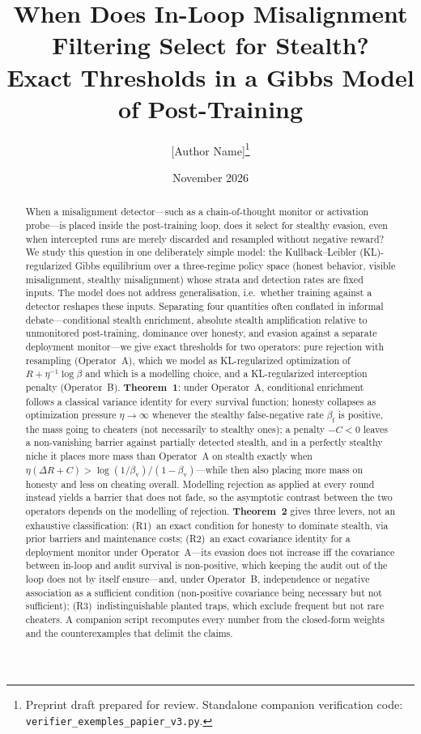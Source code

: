 \documentclass[11pt,a4paper]{article}
\title{When Does In-Loop Misalignment Filtering Select for Stealth?\\
Exact Thresholds in a Gibbs Model of Post-Training}
\author{[Author Name]\thanks{Preprint draft prepared for review. Standalone companion verification code: \texttt{verifier\_exemples\_papier\_v3.py}.}}
\date{November 2026}
\begin{document}
\maketitle

\begin{abstract}
When a misalignment detector---such as a chain-of-thought monitor or activation probe---is placed inside the post-training loop, does it select for stealthy evasion, even when intercepted runs are merely discarded and resampled without negative reward? We study this question in one deliberately simple model: the Kullback--Leibler (KL)-regularized Gibbs equilibrium over a three-regime policy space (honest behavior, visible misalignment, stealthy misalignment) whose strata and detection rates are fixed inputs. The model does not address generalisation, i.e.\ whether training against a detector reshapes these inputs. Separating four quantities often conflated in informal debate---conditional stealth enrichment, absolute stealth amplification relative to unmonitored post-training, dominance over honesty, and evasion against a separate deployment monitor---we give exact thresholds for two operators: pure rejection with resampling (Operator~A), which we model as KL-regularized optimization of $R + \eta^{-1}\log\beta$ and which is a modelling choice, and a KL-regularized interception penalty (Operator~B). \textbf{Theorem~1}: under Operator~A, conditional enrichment follows a classical variance identity for every survival function; honesty collapses as optimization pressure $\eta \to \infty$ whenever the stealthy false-negative rate $\beta_{\mathrm{f}}$ is positive, the mass going to cheaters (not necessarily to stealthy ones); a penalty $-C < 0$ leaves a non-vanishing barrier against partially detected stealth, and in a perfectly stealthy niche it places more mass than Operator~A on stealth exactly when $\eta(\Delta R + C) > \log(1/\beta_{\mathrm{v}})/(1-\beta_{\mathrm{v}})$---while then also placing more mass on honesty and less on cheating overall. Modelling rejection as applied at every round instead yields a barrier that does not fade, so the asymptotic contrast between the two operators depends on the modelling of rejection. \textbf{Theorem~2} gives three levers, not an exhaustive classification: (R1)~an exact condition for honesty to dominate stealth, via prior barriers and maintenance costs; (R2)~an exact covariance identity for a deployment monitor under Operator~A---its evasion does not increase iff the covariance between in-loop and audit survival is non-positive, which keeping the audit out of the loop does not by itself ensure---and, under Operator~B, independence or negative association as a sufficient condition (non-positive covariance being necessary but not sufficient); (R3)~indistinguishable planted traps, which exclude frequent but not rare cheaters. A companion script recomputes every number from the closed-form weights and the counterexamples that delimit the claims.
\end{abstract}
\end{document}

